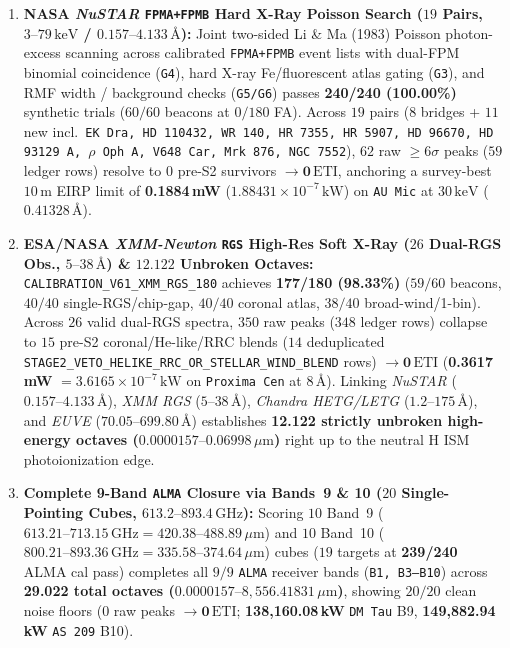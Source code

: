 \documentclass[twocolumn,10pt]{article}
\begin{document}
\begin{enumerate}
  \item \textbf{NASA \textit{NuSTAR} \texttt{FPMA+FPMB} Hard X-Ray Poisson Search ($19$ Pairs, $3\text{--}79\,\mathrm{keV}$ / $0.157\text{--}4.133\,\text{\AA}$):} Joint two-sided Li \& Ma (1983) Poisson photon-excess scanning across calibrated \texttt{FPMA+FPMB} event lists with dual-FPM binomial coincidence (\texttt{G4}), hard X-ray Fe/fluorescent atlas gating (\texttt{G3}), and RMF width / background checks (\texttt{G5/G6}) passes \textbf{240/240 (100.00\%)} synthetic trials ($60/60$ beacons at $0/180$ FA). Across $19$ pairs ($8$ bridges + $11$ new incl.\ \texttt{EK\,Dra, HD\,110432, WR\,140, HR\,7355, HR\,5907, HD\,96670, HD\,93129\,A, $\rho$\,Oph\,A, V648\,Car, Mrk\,876, NGC\,7552}), $62$ raw $\ge 6\sigma$ peaks ($59$ ledger rows) resolve to $0$ pre-S2 survivors $\rightarrow \mathbf{0\,\mathrm{ETI}}$, anchoring a survey-best $10\,\text{m}$ EIRP limit of \textbf{0.1884\,mW} ($1.88431\times 10^{-7}\,\text{kW}$) on \texttt{AU\,Mic} at $30\,\mathrm{keV}$ ($0.41328\,\text{\AA}$).
  \item \textbf{ESA/NASA \textit{XMM-Newton} \texttt{RGS} High-Res Soft X-Ray ($26$ Dual-RGS Obs., $5\text{--}38\,\text{\AA}$) \& $12.122$ Unbroken Octaves:} \texttt{CALIBRATION\_V61\_XMM\_RGS\_180} achieves \textbf{177/180 (98.33\%)} ($59/60$ beacons, $40/40$ single-RGS/chip-gap, $40/40$ coronal atlas, $38/40$ broad-wind/1-bin). Across $26$ valid dual-RGS spectra, $350$ raw peaks ($348$ ledger rows) collapse to $15$ pre-S2 coronal/He-like/RRC blends ($14$ deduplicated \texttt{STAGE2\_VETO\_HELIKE\_RRC\_OR\_STELLAR\_WIND\_BLEND} rows) $\rightarrow \mathbf{0\,\mathrm{ETI}}$ (\textbf{0.3617\,mW} $= 3.6165\times 10^{-7}\,\text{kW}$ on \texttt{Proxima Cen} at $8\,\text{\AA}$). Linking \textit{NuSTAR} ($0.157\text{--}4.133\,\text{\AA}$), \textit{XMM RGS} ($5\text{--}38\,\text{\AA}$), \textit{Chandra HETG/LETG} ($1.2\text{--}175\,\text{\AA}$), and \textit{EUVE} ($70.05\text{--}699.80\,\text{\AA}$) establishes \textbf{12.122 strictly unbroken high-energy octaves ($0.0000157\text{--}0.06998\,\mu\text{m}$)} right up to the neutral H ISM photoionization edge.
  \item \textbf{Complete 9-Band \texttt{ALMA} Closure via Bands~9 \& 10 ($20$ Single-Pointing Cubes, $613.2\text{--}893.4\,\text{GHz}$):} Scoring $10$ Band~9 ($613.21\text{--}713.15\,\text{GHz} = 420.38\text{--}488.89\,\mu\text{m}$) and $10$ Band~10 ($800.21\text{--}893.36\,\text{GHz} = 335.58\text{--}374.64\,\mu\text{m}$) cubes ($19$ targets at \textbf{239/240} ALMA cal pass) completes all $9/9$ \texttt{ALMA} receiver bands (\texttt{B1, B3--B10}) across \textbf{29.022 total octaves ($0.0000157\text{--}8{,}556.41831\,\mu\text{m}$)}, showing $20/20$ clean noise floors ($0$ raw peaks $\rightarrow \mathbf{0\,\mathrm{ETI}}$; \textbf{138,160.08\,kW} \texttt{DM\,Tau} B9, \textbf{149,882.94\,kW} \texttt{AS\,209} B10).

\end{enumerate}
\end{document}
